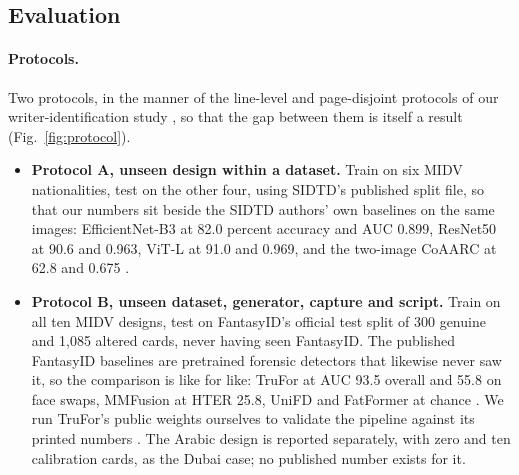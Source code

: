 \documentclass[11pt,a4paper]{article}
\begin{document}
\FloatBarrier
\subsection{Evaluation}
\label{sec:eval}

\paragraph{Protocols.} Two protocols, in the manner of the line-level and page-disjoint protocols of our writer-identification study \cite{abushahla2026ijdar}, so that the gap between them is itself a result (Fig.~\ref{fig:protocol}).

\begin{itemize}
\item \textbf{Protocol A, unseen design within a dataset.} Train on six MIDV nationalities, test on the other four, using SIDTD's published split file, so that our numbers sit beside the SIDTD authors' own baselines on the same images: EfficientNet-B3 at 82.0 percent accuracy and AUC 0.899, ResNet50 at 90.6 and 0.963, ViT-L at 91.0 and 0.969, and the two-image CoAARC at 62.8 and 0.675 \cite{boned2024sidtd}.
\item \textbf{Protocol B, unseen dataset, generator, capture and script.} Train on all ten MIDV designs, test on FantasyID's official test split of 300 genuine and 1,085 altered cards, never having seen FantasyID. The published FantasyID baselines are pretrained forensic detectors that likewise never saw it, so the comparison is like for like: TruFor at AUC 93.5 overall and 55.8 on face swaps, MMFusion at HTER 25.8, UniFD and FatFormer at chance \cite{korshunov2025fantasyid}. We run TruFor's public weights ourselves to validate the pipeline against its printed numbers \cite{guillaro2023trufor}. The Arabic design is reported separately, with zero and ten calibration cards, as the Dubai case; no published number exists for it.
\end{itemize}
\end{document}
